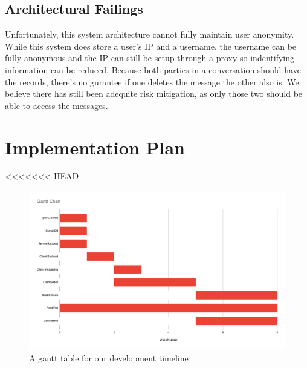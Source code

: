 \documentclass[titlepage]{article}
\begin{document}
    \subsection{Architectural Failings}

    Unfortunately, this system architecture cannot fully maintain user anonymity.
    While this system does store a user's IP and a username, the username can be fully anonymous and the IP can still be setup through a proxy so indentifying information can be reduced.
    Because both parties in a conversation should have the records, there's no gurantee if one deletes the message the other also is.
    We believe there has still been adequite risk mitigation, as only those two should be able to access the messages.

    \section{Implementation Plan}
<<<<<<< HEAD
    
    \begin{center}
        \begin{figure}[!ht]
            \includegraphics[scale=.35]{graphics/GanttChart.png}
            \caption{A gantt table for our development timeline}
        \end{figure}
    \end{center}
\end{document}
